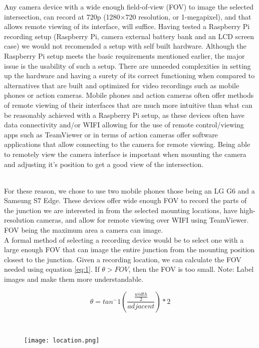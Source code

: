 Any camera device with a wide enough field-of-view (FOV) to image the selected intersection, can record at 720p (1280×720 resolution, or 1-megapixel), and that allows remote viewing of its interface,
will suffice. Having tested a Raspberry Pi recording setup (Raspberry Pi, camera external battery bank and an LCD screen case) we would not recomended a setup with self built hardware.
Although the Raspberry Pi setup meets the basic requirements mentioned earlier, the major issue is the usability of such a setup. There are unneeded complexities in
setting up the hardware and having a surety of its correct functioning when compared to alternatives that are built and optimized for video recordings such as
mobile phones or action cameras. Mobile phones and action cameras often offer methods of remote viewing of their interfaces that are much more
intuitive than what can be reasonably achieved with a Raspberry Pi setup, as these devices often have data connectivity and/or WIFI allowing for the use of remote control/viewing apps such as TeamViewer or in terms of action cameras
offer software applications that allow connecting to the camera for remote viewing. Being able to remotely view the camera interface is important when mounting the
camera and adjusting it's position to get a good view of the intersection.

\ \\
For these reason, we chose to use two mobile phones those being an LG G6 and a Samsung S7 Edge.
These devices offer wide enough FOV to record the parts of the junction we are interested in from the selected mounting locations, have high-resolution cameras, and allow for remote viewing over WIFI using TeamViewer.
FOV being the maximum area a camera can image. 
\ \\

A formal method of selecting a recording device would be to select one with a large enough FOV that can image the entire junction from the mounting position closest to the junction. Given a recording location, we can calculate the FOV needed using equation \ref{eq:1}.
If $\theta > FOV$, then the FOV is too small. 
\color{red}
Note: Label images and make them more understandable.
\color{black}

\begin{equation}
    \theta = tan^-1(\frac{\frac{width}{2}}{adjacent}) * 2\label{eq:1}
  \end{equation}

\ \\ 
\begin{figure}[h]
\texttt{[image: location.png]}
\centering 
\end{figure}
\label{Camera location}

